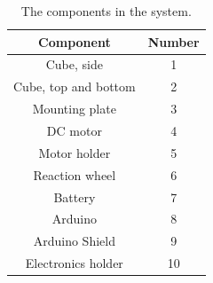 \begin{table}
    \centering
    \begin{tabular}{cc}\toprule
     Component & Number \\\midrule
     Cube, side               & 1\\
     Cube, top and bottom     & 2\\
     Mounting plate           & 3\\
     DC motor                 & 4\\
     Motor holder             & 5\\
     Reaction wheel           & 6\\
     Battery                  & 7\\
     Arduino                  & 8\\
     Arduino Shield           & 9\\
     Electronics holder       & 10\\\bottomrule
    \end{tabular}
    \caption{The components in the system.}
    \label{table:SystemComponents}
\end{table}